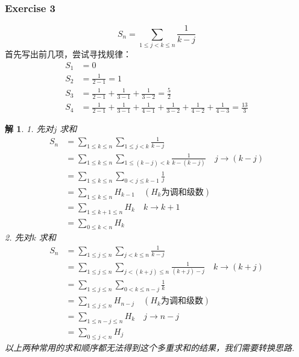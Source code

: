 \documentclass[mode=geye]{elegantnote}
\newtheorem{solve}{解}
\begin{document}
\subsubsection{Exercise 3}
\begin{equation*}
    S_n = \sum_{1\leqslant j < k\leqslant n}\frac{1}{k-j}
\end{equation*}
首先写出前几项，尝试寻找规律：
\begin{align*}
    S_1 &= 0\\
    S_2 &= \frac{1}{2-1} = 1\\
    S_3 &= \frac{1}{2-1}+\frac{1}{3-1}+\frac{1}{3-2} = \frac{5}{2}\\
    S_4 &= \frac{1}{2-1}+\frac{1}{3-1}+\frac{1}{4-1}+\frac{1}{3-2}+\frac{1}{4-2}+\frac{1}{4-3} = \frac{13}{3}
\end{align*}
\begin{solve}
    1. 先对$ j $ 求和
    \begin{align*}
        S_n 
        &= \sum_{1\leqslant k \leqslant n} \sum_{1\leqslant j < k}\frac{1}{k-j}\\
        &= \sum_{1\leqslant k \leqslant n} \sum_{1\leqslant (k-j) < k}\frac{1}{k-(k-j)} \quad j\rightarrow (k-j) \\
        &= \sum_{1\leqslant k \leqslant n} \sum_{0<j\leqslant k-1}\frac{1}{j} \\
        &= \sum_{1\leqslant k \leqslant n} H_{k-1} \quad(H_k\text{为调和级数})\\
        &= \sum_{1\leqslant k+1 \leqslant n} H_{k}\quad k\rightarrow k+1 \\
        &= \sum_{0\leqslant k < n} H_{k}
    \end{align*}
    2. 先对$ k $ 求和
    \begin{align*}
        S_n 
        &= \sum_{1\leqslant j \leqslant n} \sum_{j < k\leqslant n}\frac{1}{k-j}\\
        &= \sum_{1\leqslant j \leqslant n} \sum_{j < (k+j)\leqslant n}\frac{1}{(k+j)-j} \quad k\rightarrow (k+j) \\
        &= \sum_{1\leqslant j \leqslant n} \sum_{0<k\leqslant n-j}\frac{1}{k} \\
        &= \sum_{1\leqslant j \leqslant n} H_{n-j} \quad(H_k\text{为调和级数})\\
        &= \sum_{1\leqslant n-j \leqslant n} H_{k}\quad j\rightarrow n-j \\
        &= \sum_{0\leqslant j < n} H_{j}
    \end{align*}
    以上两种常用的求和顺序都无法得到这个多重求和的结果，我们需要转换思路.


\end{solve}
\end{document}
